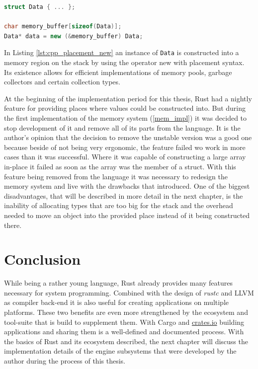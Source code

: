 \begin{lstlisting}[caption={Using placement-new to construct an object in a pre-allocated memory location}, label={lst:cpp_placement_new}, language=C++]
struct Data { ... };

char memory_buffer[sizeof(Data)];
Data* data = new (&memory_buffer) Data;
\end{lstlisting}

In Listing \ref{lst:cpp_placement_new} an instance of \texttt{Data} is constructed into a memory region on the stack by using the operator new with placement syntax. Its existence allows for efficient implementations of memory pools, garbage collectors and certain collection types.

At the beginning of the implementation period for this thesis, Rust had a nightly feature for providing places where values could be constructed into. But during the first implementation of the memory system (\ref{mem_impl}) it was decided to stop development of it and remove all of its parts from the language. It is the author's opinion that the decision to remove the unstable version was a good one because beside of not being very ergonomic, the feature failed wo work in more cases than it was successful. Where it was capable of constructing a large array in-place it failed as soon as the array was the member of a struct. With this feature being removed from the language it was necessary to redesign the memory system and live with the drawbacks that introduced. One of the biggest disadvantages, that will be described in more detail in the next chapter, is the inability of allocating types that are too big for the stack and the overhead needed to move an object into the provided place instead of it being constructed there.

\section{Conclusion}

While being a rather young language, Rust already provides many features necessary for system programming. Combined with the design of \textit{rustc} and \ac{LLVM} as compiler back-end it is also useful for creating applications on multiple platforms. These two benefits are even more strengthened by the ecosystem and tool-suite that is build to supplement them. With Cargo and \url{crates.io} building applications and sharing them is a well-defined and documented process. With the basics of Rust and its ecosystem described, the next chapter will discuss the implementation details of the engine subsystems that were developed by the author during the process of this thesis.

